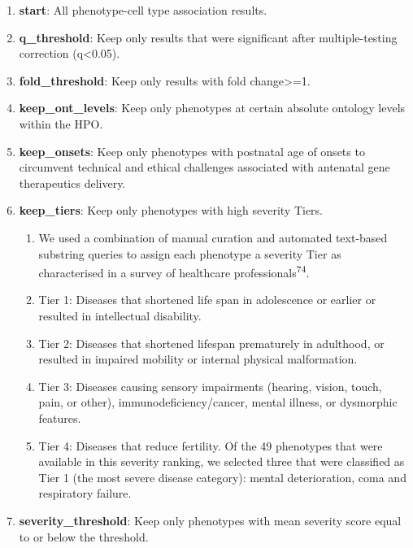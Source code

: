\documentclass[
sn-nature
]{sn-jnl}
\begin{document}
\begin{enumerate}
\def\labelenumi{\arabic{enumi}.}
\item
  \textbf{start}: All phenotype-cell type association results.
\item
  \textbf{q\_threshold}: Keep only results that were significant after
  multiple-testing correction (q\textless0.05).
\item
  \textbf{fold\_threshold}: Keep only results with fold
  change\textgreater=1.
\item
  \textbf{keep\_ont\_levels}: Keep only phenotypes at certain absolute
  ontology levels within the HPO.
\item
  \textbf{keep\_onsets}: Keep only phenotypes with postnatal age of
  onsets to circumvent technical and ethical challenges associated with
  antenatal gene therapeutics delivery.
\item
  \textbf{keep\_tiers}: Keep only phenotypes with high severity Tiers.

  \begin{enumerate}
  \def\labelenumii{\arabic{enumii}.}
  \item
    We used a combination of manual curation and automated text-based
    substring queries to assign each phenotype a severity Tier as
    characterised in a survey of healthcare
    professionals\textsuperscript{74}.
  \item
    Tier 1: Diseases that shortened life span in adolescence or earlier
    or resulted in intellectual disability.
  \item
    Tier 2: Diseases that shortened lifespan prematurely in adulthood,
    or resulted in impaired mobility or internal physical malformation.
  \item
    Tier 3: Diseases causing sensory impairments (hearing, vision,
    touch, pain, or other), immunodeficiency/cancer, mental illness, or
    dysmorphic features.
  \item
    Tier 4: Diseases that reduce fertility. Of the 49 phenotypes that
    were available in this severity ranking, we selected three that were
    classified as Tier 1 (the most severe disease category): mental
    deterioration, coma and respiratory failure.
  \end{enumerate}
\item
  \textbf{severity\_threshold}: Keep only phenotypes with mean severity
  score equal to or below the threshold.


\end{enumerate}
\end{document}
